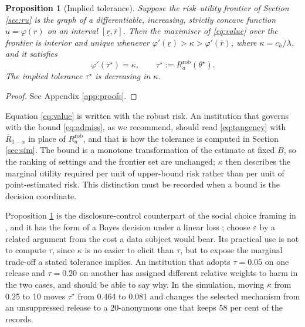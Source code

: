 \documentclass[11pt,a4paper]{article}
\theoremstyle{plain}
\newtheorem{proposition}{Proposition}
\theoremstyle{definition}
\begin{document}
\begin{proposition}[Implied tolerance]\label{prop:tau}
Suppose the risk--utility frontier of Section \ref{sec:ru} is the graph of a
differentiable, increasing, strictly concave function $u = \varphi(r)$ on an
interval
$[\underline{r}, \overline{r}]$. Then the maximiser of \eqref{eq:value} over
the frontier is interior and unique whenever $\varphi'(\underline{r}) > \kappa
> \varphi'(\overline{r})$, where $\kappa = c_h / \lambda$, and it satisfies
\begin{equation}
\varphi'(\tau^\star) = \kappa , \qquad \tau^\star := R_a^{\mathrm{rob}}(\theta^\star) .
\label{eq:tangency}
\end{equation}
The implied tolerance $\tau^\star$ is decreasing in $\kappa$.
\end{proposition}

\begin{proof}
See Appendix \ref{app:proofs}.
\end{proof}

Equation \eqref{eq:value} is written with the robust risk. An institution that
governs with the bound \eqref{eq:admiss}, as we recommend, should read
\eqref{eq:tangency} with $\overline{R}_{1-\alpha}$ in place of
$R_a^{\mathrm{rob}}$, and that is how the tolerance is computed in Section
\ref{sec:sim}. The bound is a monotone transformation of the estimate at
fixed $B$, so the ranking of settings and the frontier set are unchanged;
$\kappa$ then describes the marginal utility required per unit of
upper-bound risk rather than per unit of point-estimated risk. This distinction
must be recorded when a bound is the decision coordinate.

Proposition \ref{prop:tau} is the disclosure-control counterpart of the social
choice framing in \citet{abowd2019}, and it has the form of a Bayes decision
under a linear loss \citep{berger1985}; \citet{hsu2014} choose $\varepsilon$ by
a related argument from the cost a data subject would bear. Its practical use is not to compute
$\tau$, since $\kappa$ is no easier to elicit than $\tau$, but to expose the
marginal trade-off a stated tolerance implies. An institution that adopts $\tau =
0.05$ on one release and $\tau = 0.20$ on another has assigned different relative weights to harm
in the two cases, and should be able to say why. In the simulation, moving
$\kappa$ from 0.25 to 10 moves $\tau^\star$ from 0.464 to 0.081 and changes the
selected mechanism from an unsuppressed release to a 20-anonymous one that keeps
58 per cent of the records.
\end{document}
